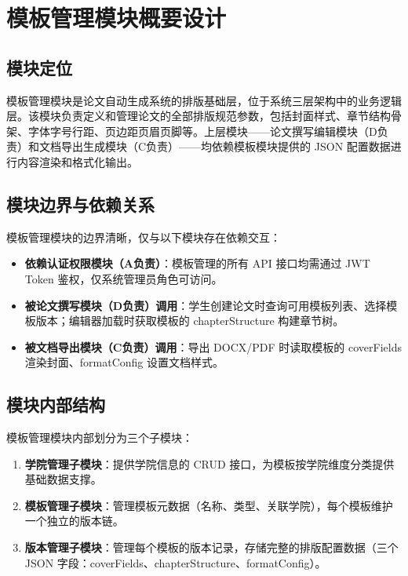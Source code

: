 
\section{模板管理模块概要设计}

\subsection{模块定位}

模板管理模块是论文自动生成系统的排版基础层，位于系统三层架构中的业务逻辑层。该模块负责定义和管理论文的全部排版规范参数，包括封面样式、章节结构骨架、字体字号行距、页边距页眉页脚等。上层模块——论文撰写编辑模块（D负责）和文档导出生成模块（C负责）——均依赖模板模块提供的 JSON 配置数据进行内容渲染和格式化输出。

\subsection{模块边界与依赖关系}

模板管理模块的边界清晰，仅与以下模块存在依赖交互：

\begin{itemize}
    \item \textbf{依赖认证权限模块（A负责）}：模板管理的所有 API 接口均需通过 JWT Token 鉴权，仅系统管理员角色可访问。
    \item \textbf{被论文撰写模块（D负责）调用}：学生创建论文时查询可用模板列表、选择模板版本；编辑器加载时获取模板的 chapterStructure 构建章节树。
    \item \textbf{被文档导出模块（C负责）调用}：导出 DOCX/PDF 时读取模板的 coverFields 渲染封面、formatConfig 设置文档样式。
\end{itemize}

\subsection{模块内部结构}

模板管理模块内部划分为三个子模块：

\begin{enumerate}
    \item \textbf{学院管理子模块}：提供学院信息的 CRUD 接口，为模板按学院维度分类提供基础数据支撑。
    \item \textbf{模板管理子模块}：管理模板元数据（名称、类型、关联学院），每个模板维护一个独立的版本链。
    \item \textbf{版本管理子模块}：管理每个模板的版本记录，存储完整的排版配置数据（三个 JSON 字段：coverFields、chapterStructure、formatConfig）。
\end{enumerate}

